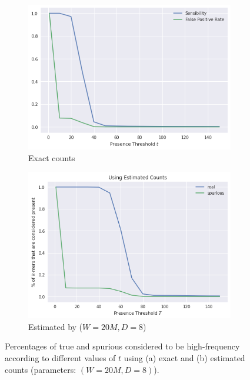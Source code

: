 \begin{figure}[htbp]
    \centering
    \begin{subfigure}{.5\textwidth}
        \centering
        \includegraphics[width=\textwidth]{figures/e_coli-threshold_exploration-K31-exact}
        \caption{Exact counts}\label{fig:ecoli-art-threshold-exact}
    \end{subfigure}%
    \begin{subfigure}{.5\textwidth}
        \centering
        \includegraphics[width=\textwidth]{figures/e_coli-threshold_exploration-K31-W20000000-D8}
        \caption{Estimated by \dBCM ($W=20M, D=8$)}\label{fig:ecoli-art-frequencies-W20000000-D8}
    \end{subfigure}
	\caption{Percentages of true and spurious  considered to be high-frequency according to different values of $t$ using (a) exact and (b) estimated counts (\dBCM parameters: $(W=20M, D=8)$).}\label{fig:ecoli-art-thresholds}
\end{figure}

